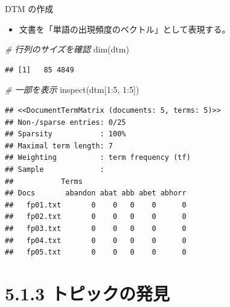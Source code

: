 \documentclass[
  ignorenonframetext,
]{beamer}
\newenvironment{Shaded}{\begin{snugshade}}{\end{snugshade}}
\newcommand{\CommentTok}[1]{\textcolor[rgb]{0.56,0.35,0.01}{\textit{#1}}}
\newcommand{\DecValTok}[1]{\textcolor[rgb]{0.00,0.00,0.81}{#1}}
\newcommand{\FunctionTok}[1]{\textcolor[rgb]{0.00,0.00,0.00}{#1}}
\newcommand{\NormalTok}[1]{#1}
\newcommand{\SpecialCharTok}[1]{\textcolor[rgb]{0.00,0.00,0.00}{#1}}
\providecommand{\tightlist}{%
  \setlength{\itemsep}{0pt}\setlength{\parskip}{0pt}}
\begin{document}
\begin{frame}[fragile]{DTM の作成}
\protect\hypertarget{dtm-ux306eux4f5cux6210}{}
\begin{itemize}
\tightlist
\item
  文書を「単語の出現頻度のベクトル」として表現する。
\end{itemize}

\scriptsize

\begin{Shaded}
\begin{Highlighting}[]
\CommentTok{\# 行列のサイズを確認}
\FunctionTok{dim}\NormalTok{(dtm)}
\end{Highlighting}
\end{Shaded}

\begin{verbatim}
## [1]   85 4849
\end{verbatim}

\begin{Shaded}
\begin{Highlighting}[]
\CommentTok{\# 一部を表示}
\FunctionTok{inspect}\NormalTok{(dtm[}\DecValTok{1}\SpecialCharTok{:}\DecValTok{5}\NormalTok{, }\DecValTok{1}\SpecialCharTok{:}\DecValTok{5}\NormalTok{])}
\end{Highlighting}
\end{Shaded}

\begin{verbatim}
## <<DocumentTermMatrix (documents: 5, terms: 5)>>
## Non-/sparse entries: 0/25
## Sparsity           : 100%
## Maximal term length: 7
## Weighting          : term frequency (tf)
## Sample             :
##           Terms
## Docs       abandon abat abb abet abhorr
##   fp01.txt       0    0   0    0      0
##   fp02.txt       0    0   0    0      0
##   fp03.txt       0    0   0    0      0
##   fp04.txt       0    0   0    0      0
##   fp05.txt       0    0   0    0      0
\end{verbatim}

\normalsize
\end{frame}

\hypertarget{ux30c8ux30d4ux30c3ux30afux306eux767aux898b}{%
\section{5.1.3
トピックの発見}\label{ux30c8ux30d4ux30c3ux30afux306eux767aux898b}}
\end{document}

